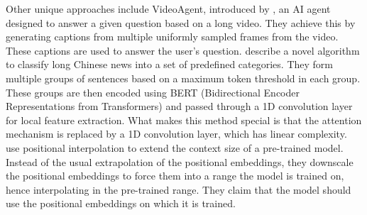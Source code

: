 Other unique approaches include VideoAgent, introduced by \citet{wang2024videoagent}, an AI agent designed to answer a given question based on a long video.
They achieve this by generating captions from multiple uniformly sampled frames from the video.
These captions are used to answer the user's question.
\citet{chen2022long} describe a novel algorithm to classify long Chinese news into a set of predefined categories.
They form multiple groups of sentences based on a maximum token threshold in each group.
These groups are then encoded using BERT (Bidirectional Encoder Representations from Transformers) \cite{devlin2018bert} and passed through a 1D convolution layer for local feature extraction.
What makes this method special is that the attention mechanism is replaced by a 1D convolution layer, which has linear complexity.
\citet{chen2023extending} use positional interpolation to extend the context size of a pre-trained model.
Instead of the usual extrapolation of the positional embeddings, they downscale the positional embeddings to force them into a range the model is trained on, hence interpolating in the pre-trained range.
They claim that the model should use the positional embeddings on which it is trained.
